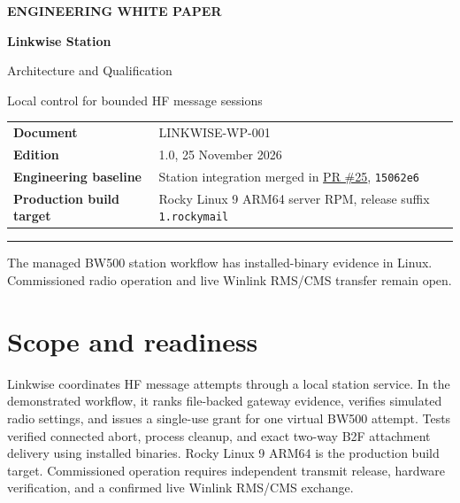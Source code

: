 \documentclass[11pt,a4paper]{article}
\begin{document}
\hypersetup{pageanchor=false}
\begin{titlepage}
  \pagecolor{linkwisepale}\color{linkwisenavy}
  \vspace*{0.62in}
  {\large\bfseries ENGINEERING WHITE PAPER\par}
  \vspace{0.3in}
  {\Huge\bfseries Linkwise Station\par
  Architecture and Qualification\par}
  \vspace{0.3in}
  {\Large Local control for bounded HF message sessions\par}
  \vspace{0.55in}
  \begin{tabularx}{\textwidth}{@{}p{1.94in}Y@{}}
    \textbf{Document} & LINKWISE-WP-001\\[0.2em]
    \textbf{Edition} & 1.0, 25 November 2026\\[0.2em]
    \textbf{Engineering baseline} & Station integration merged in
    \href{https://github.com/8r4n/linkwise/pull/25}{PR \#25},
    \texttt{15062e6}\\[0.2em]
    \textbf{Production build target} & Rocky Linux 9 ARM64 server RPM,
    release suffix \texttt{1.rockymail}\\
  \end{tabularx}
  \vfill
  \rule{\textwidth}{0.5pt}\par
  The managed BW500 station workflow has installed-binary evidence in Linux.
  Commissioned radio operation and live Winlink RMS/CMS transfer remain open.
\end{titlepage}
\nopagecolor
\color{black}
\hypersetup{pageanchor=true}

\section{Scope and readiness}
\label{sec:scope}

Linkwise coordinates HF message attempts through a local station service.
In the demonstrated workflow, it ranks file-backed gateway evidence,
verifies simulated radio settings, and issues a single-use grant for one
virtual BW500 attempt. Tests verified connected abort, process cleanup,
and exact two-way B2F attachment delivery using installed binaries.
Rocky Linux 9 ARM64 is the production build target. Commissioned operation
requires independent transmit release, hardware verification, and a
confirmed live Winlink RMS/CMS exchange.
\end{document}
